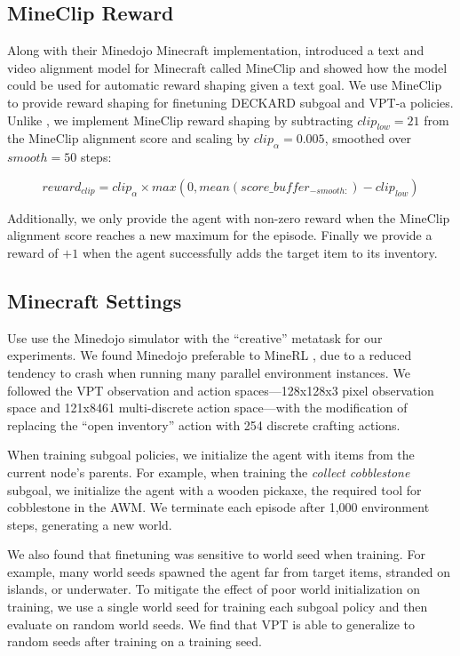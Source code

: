 \documentclass[nohyperref]{article}
\theoremstyle{plain}
\theoremstyle{definition}
\theoremstyle{remark}
\newcommand{\agentshort}{\textsc{DECKARD}}
\begin{document}
\subsection{MineClip Reward}

Along with their Minedojo Minecraft implementation, \citet{fanminedojo} introduced a text and video alignment model for Minecraft called MineClip and showed how the model could be used for automatic reward shaping given a text goal.
We use MineClip to provide reward shaping for finetuning \agentshort{} subgoal and VPT-a policies.
Unlike \citet{fanminedojo}, we implement MineClip reward shaping by subtracting $clip_{low}=21$ from the MineClip alignment score and scaling by $clip_\alpha=0.005$, smoothed over $smooth=50$ steps:

$$reward_{clip} = clip_\alpha \times max(0, mean(score\_buffer_{-smooth:}) - clip_{low})$$

Additionally, we only provide the agent with non-zero reward when the MineClip alignment score reaches a new maximum for the episode.
Finally we provide a reward of $+1$ when the agent successfully adds the target item to its inventory.

\subsection{Minecraft Settings}
\label{app:minecraft}

Use use the Minedojo simulator \cite{fanminedojo} with the ``creative'' metatask for our experiments.
We found Minedojo preferable to MineRL \cite{GussMineRL}, due to a reduced tendency to crash when running many parallel environment instances.
We followed the VPT \cite{bakervideo} observation and action spaces---128x128x3 pixel observation space and 121x8461 multi-discrete action space---with the modification of replacing the ``open inventory'' action with 254 discrete crafting actions.

When training subgoal policies, we initialize the agent with items from the current node's parents.
For example, when training the \emph{collect cobblestone} subgoal, we initialize the agent with a wooden pickaxe, the required tool for cobblestone in the AWM.
We terminate each episode after 1,000 environment steps, generating a new world.

We also found that finetuning was sensitive to world seed when training.
For example, many world seeds spawned the agent far from target items, stranded on islands, or underwater.
To mitigate the effect of poor world initialization on training, we use a single world seed for training each subgoal policy and then evaluate on random world seeds.
We find that VPT is able to generalize to random seeds after training on a training seed.
\end{document}
